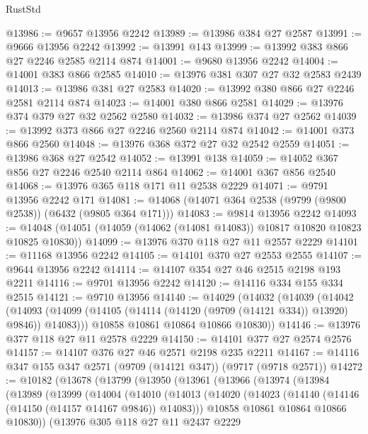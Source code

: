 \begin{lexlean}{RustStd}
\begin{coremodule}
@13986 := @9657 @13956 @2242
@13989 := @13986 @384 @27 @2587
@13991 := @9666 @13956 @2242
@13992 := @13991 @143
@13999 := @13992 @383 @866 @27 @2246 @2585 @2114 @874
@14001 := @9680 @13956 @2242
@14004 := @14001 @383 @866 @2585
@14010 := @13976 @381 @307 @27 @32 @2583 @2439
@14013 := @13986 @381 @27 @2583
@14020 := @13992 @380 @866 @27 @2246 @2581 @2114 @874
@14023 := @14001 @380 @866 @2581
@14029 := @13976 @374 @379 @27 @32 @2562 @2580
@14032 := @13986 @374 @27 @2562
@14039 := @13992 @373 @866 @27 @2246 @2560 @2114 @874
@14042 := @14001 @373 @866 @2560
@14048 := @13976 @368 @372 @27 @32 @2542 @2559
@14051 := @13986 @368 @27 @2542
@14052 := @13991 @138
@14059 := @14052 @367 @856 @27 @2246 @2540 @2114 @864
@14062 := @14001 @367 @856 @2540
@14068 := @13976 @365 @118 @171 @11 @2538 @2229
@14071 := @9791 @13956 @2242 @171
@14081 := @14068 (@14071 @364 @2538 (@9799 (@9800 @2538)) (@6432 (@9805 @364 @171)))
@14083 := @9814 @13956 @2242
@14093 := @14048 (@14051 (@14059 (@14062 (@14081 @14083)) @10817 @10820 @10823 @10825 @10830))
@14099 := @13976 @370 @118 @27 @11 @2557 @2229
@14101 := @11168 @13956 @2242
@14105 := @14101 @370 @27 @2553 @2555
@14107 := @9644 @13956 @2242
@14114 := @14107 @354 @27 @46 @2515 @2198 @193 @2211
@14116 := @9701 @13956 @2242
@14120 := @14116 @334 @155 @334 @2515
@14121 := @9710 @13956
@14140 := @14029
    (@14032
      (@14039
        (@14042
          (@14093 (@14099 (@14105 (@14114 (@14120 (@9709 (@14121 @334)) @13920) @9846)) @14083)))
        @10858
        @10861
        @10864
        @10866
        @10830))
@14146 := @13976 @377 @118 @27 @11 @2578 @2229
@14150 := @14101 @377 @27 @2574 @2576
@14157 := @14107 @376 @27 @46 @2571 @2198 @235 @2211
@14167 := @14116 @347 @155 @347 @2571 (@9709 (@14121 @347)) (@9717 (@9718 @2571))
@14272 := @10182
    (@13678
      (@13799
        (@13950
          (@13961
            (@13966
              (@13974
                (@13984
                  (@13989
                    (@13999
                      (@14004
                        (@14010
                          (@14013
                            (@14020
                              (@14023 (@14140 (@14146 (@14150 (@14157 @14167 @9846)) @14083)))
                              @10858
                              @10861
                              @10864
                              @10866
                              @10830))
                          (@13976
                            @305
                            @118
                            @27
                            @11
                            @2437
                            @2229

\end{coremodule}
\end{lexlean}
